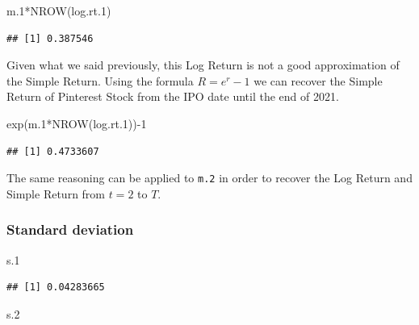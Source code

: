 \documentclass[
]{article}
\newenvironment{Shaded}{\begin{snugshade}}{\end{snugshade}}
\newcommand{\DecValTok}[1]{\textcolor[rgb]{0.00,0.00,0.81}{#1}}
\newcommand{\FloatTok}[1]{\textcolor[rgb]{0.00,0.00,0.81}{#1}}
\newcommand{\FunctionTok}[1]{\textcolor[rgb]{0.00,0.00,0.00}{#1}}
\newcommand{\NormalTok}[1]{#1}
\newcommand{\SpecialCharTok}[1]{\textcolor[rgb]{0.00,0.00,0.00}{#1}}
\begin{document}
\begin{Shaded}
\begin{Highlighting}[]
\NormalTok{m}\FloatTok{.1}\SpecialCharTok{*}\FunctionTok{NROW}\NormalTok{(log.rt}\FloatTok{.1}\NormalTok{)}
\end{Highlighting}
\end{Shaded}

\begin{verbatim}
## [1] 0.387546
\end{verbatim}

Given what we said previously, this Log Return is not a good
approximation of the Simple Return. Using the formula \(R=e^{r}-1\) we
can recover the Simple Return of Pinterest Stock from the IPO date until
the end of 2021.

\begin{Shaded}
\begin{Highlighting}[]
\FunctionTok{exp}\NormalTok{(m}\FloatTok{.1}\SpecialCharTok{*}\FunctionTok{NROW}\NormalTok{(log.rt}\FloatTok{.1}\NormalTok{))}\SpecialCharTok{{-}}\DecValTok{1}
\end{Highlighting}
\end{Shaded}

\begin{verbatim}
## [1] 0.4733607
\end{verbatim}

The same reasoning can be applied to \texttt{m.2} in order to recover
the Log Return and Simple Return from \(t=2\) to \(T\).

\hypertarget{standard-deviation}{%
\subsubsection{Standard deviation}\label{standard-deviation}}

\begin{Shaded}
\begin{Highlighting}[]
\NormalTok{s}\FloatTok{.1}
\end{Highlighting}
\end{Shaded}

\begin{verbatim}
## [1] 0.04283665
\end{verbatim}

\begin{Shaded}
\begin{Highlighting}[]
\NormalTok{s}\FloatTok{.2}
\end{Highlighting}
\end{Shaded}
\end{document}
